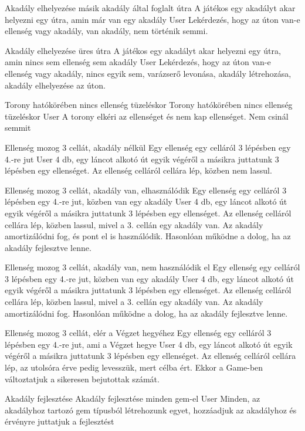 \usecase
{Akadály elhelyezése másik akadály által foglalt útra}
{A játékos egy akadályt akar helyezni egy útra, amin már van egy akadály}
{User}
{Lekérdezés, hogy az úton van-e ellenség vagy akadály, van akadály, nem történik semmi.}

\usecase
{Akadály elhelyezése üres útra}
{A játékos egy akadályt akar helyezni egy útra, amin nincs sem ellenség sem akadály}
{User}
{Lekérdezés, hogy az úton van-e ellenség vagy akadály, nincs egyik sem, varázserő levonása, akadály létrehozása, akadály elhelyezése az úton.}

\usecase
{Torony hatókörében nincs ellenség tüzeléskor}
{Torony hatókörében nincs ellenség tüzeléskor}
{User}
{A torony elkéri az ellenséget és nem kap ellenséget. Nem csinál semmit}

\usecase
{Ellenség mozog 3 cellát, akadály nélkül}
{Egy ellenség egy celláról 3 lépésben egy 4.-re jut}
{User}
{4 db, egy láncot alkotó út egyik végéről a másikra juttatunk 3 lépésben egy ellenséget. Az ellenség celláról cellára lép, közben nem lassul.}

\usecase
{Ellenség mozog 3 cellát, akadály van, elhasználódik}
{Egy ellenség egy celláról 3 lépésben egy 4.-re jut, közben van egy akadály}
{User}
{4 db, egy láncot alkotó út egyik végéről a másikra juttatunk 3 lépésben egy ellenséget. Az ellenség celláról cellára lép, közben lassul, mivel a 3. cellán egy akadály van. Az akadály amortizálódni fog, és pont el is használódik. Hasonlóan működne a dolog, ha az akadály fejlesztve lenne.}

\usecase
{Ellenség mozog 3 cellát, akadály van, nem használódik el }
{Egy ellenség egy celláról 3 lépésben egy 4.-re jut, közben van egy akadály}
{User}
{4 db, egy láncot alkotó út egyik végéről a másikra juttatunk 3 lépésben egy ellenséget. Az ellenség celláról cellára lép, közben lassul, mivel a 3. cellán egy akadály van. Az akadály amortizálódni fog. Hasonlóan működne a dolog, ha az akadály fejlesztve lenne.}

\usecase
{Ellenség mozog 3 cellát, elér a Végzet hegyéhez }
{Egy ellenség egy celláról 3 lépésben egy 4.-re jut, ami a Végzet hegye}
{User}
{4 db, egy láncot alkotó út egyik végéről a másikra juttatunk 3 lépésben egy ellenséget. Az ellenség celláról cellára lép, az utolsóra érve pedig levesszük, mert célba ért. Ekkor a Game-ben változtatjuk a sikeresen bejutottak számát.}

\usecase
{Akadály fejlesztése}
{Akadály fejlesztése minden gem-el}
{User}
{Minden, az akadályhoz tartozó gem típusból létrehozunk egyet, hozzáadjuk az akadályhoz és érvényre juttatjuk a fejlesztést}

